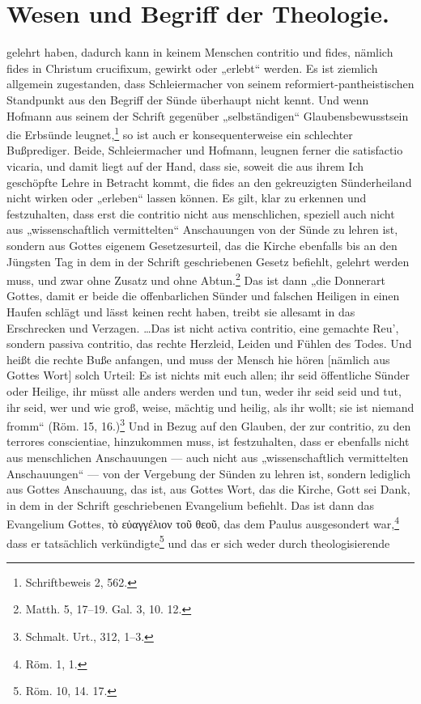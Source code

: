 \noindent{}\vspace{-1.5\baselineskip}\section*{Wesen und Begriff der Theologie.}\vspace{\baselineskip}gelehrt haben, dadurch kann in keinem Menschen contritio und fides, nämlich fides in Christum crucifixum, gewirkt oder „erlebt“ werden. Es ist ziemlich allgemein zugestanden, dass Schleiermacher von seinem reformiert-pantheistischen Standpunkt aus den Begriff der Sünde überhaupt nicht kennt. Und wenn Hofmann aus seinem der Schrift gegenüber „selbständigen“ Glaubensbewusstsein die Erbsünde leugnet,\footnote{Schriftbeweis 2, 562.} so ist auch er konsequenterweise ein schlechter Bußprediger. Beide, Schleiermacher und Hofmann, leugnen ferner die satisfactio vicaria, und damit liegt auf der Hand, dass sie, soweit die aus ihrem Ich geschöpfte Lehre in Betracht kommt, die fides an den gekreuzigten Sünderheiland nicht wirken oder „erleben“ lassen können. Es gilt, klar zu erkennen und festzuhalten, dass erst die contritio nicht aus menschlichen, speziell auch nicht aus „wissenschaftlich vermittelten“ Anschauungen von der Sünde zu lehren ist, sondern aus Gottes eigenem Gesetzesurteil, das die Kirche ebenfalls bis an den Jüngsten Tag in dem in der Schrift geschriebenen Gesetz befiehlt, gelehrt werden muss, und zwar ohne Zusatz und ohne Abtun.\footnote{Matth. 5, 17--19. Gal. 3, 10. 12.} Das ist dann „die Donnerart Gottes, damit er beide die offenbarlichen Sünder und falschen Heiligen in einen Haufen schlägt und lässt keinen recht haben, treibt sie allesamt in das Erschrecken und Verzagen. \ldots Das ist nicht activa contritio, eine gemachte Reu', sondern passiva contritio, das rechte Herzleid, Leiden und Fühlen des Todes. Und heißt die rechte Buße anfangen, und muss der Mensch hie hören [nämlich aus Gottes Wort] solch Urteil: Es ist nichts mit euch allen; ihr seid öffentliche Sünder oder Heilige, ihr müsst alle anders werden und tun, weder ihr seid seid und tut, ihr seid, wer und wie groß, weise, mächtig und heilig, als ihr wollt; sie ist niemand fromm“ \textnormal{(Röm. 15, 16.)}\footnote{Schmalt. Urt., 312, 1--3.} Und in Bezug auf den Glauben, der zur contritio, zu den terrores conscientiae, hinzukommen muss, ist festzuhalten, dass er ebenfalls nicht aus menschlichen Anschauungen --- auch nicht aus „wissenschaftlich vermittelten Anschauungen“ --- von der Vergebung der Sünden zu lehren ist, sondern lediglich aus Gottes Anschauung, das ist, aus Gottes Wort, das die Kirche, Gott sei Dank, in dem in der Schrift geschriebenen Evangelium befiehlt. Das ist dann das Evangelium Gottes, \foreignlanguage{greek}{τὸ εὐαγγέλιον τοῦ θεοῦ}, das dem Paulus ausgesondert war,\footnote{Röm. 1, 1.} dass er tatsächlich verkündigte\footnote{Röm. 10, 14. 17.} und das er sich weder durch theologisierende